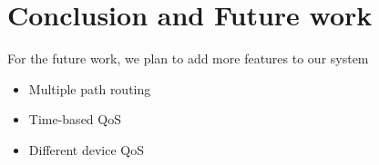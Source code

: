 \section{Conclusion and Future work}
\label{sect:future}
For the future work, we plan to add more features to our system
\begin{itemize}
\item Multiple path routing
\item Time-based QoS
\item Different device QoS
\end{itemize}
